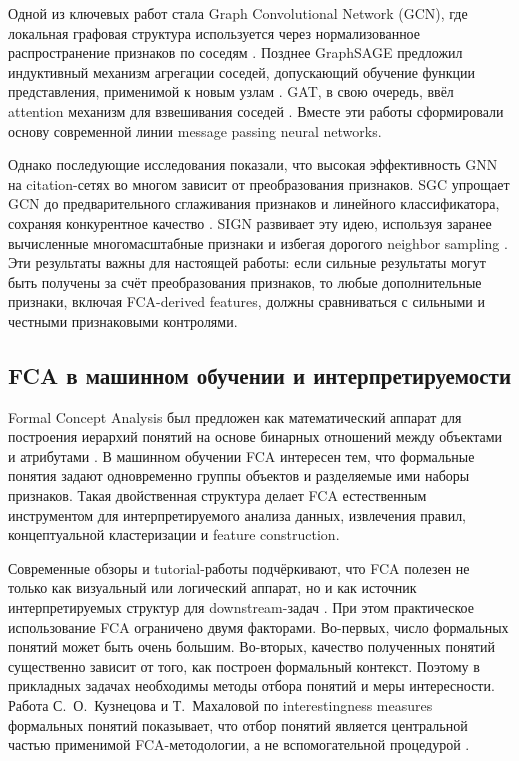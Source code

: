 \documentclass[14pt,a4paper]{extarticle}
\begin{document}
Одной из ключевых работ стала Graph Convolutional Network (GCN), где локальная
графовая структура используется через нормализованное распространение признаков
по соседям \cite{kipf2017gcn}. Позднее GraphSAGE предложил индуктивный механизм
агрегации соседей, допускающий обучение функции представления, применимой к
новым узлам \cite{hamilton2017graphsage}. GAT, в свою очередь, ввёл attention
механизм для взвешивания соседей \cite{velickovic2018gat}. Вместе эти работы
сформировали основу современной линии message passing neural networks.

Однако последующие исследования показали, что высокая эффективность GNN на
citation-сетях во многом зависит от преобразования признаков. SGC упрощает GCN
до предварительного сглаживания признаков и линейного классификатора, сохраняя
конкурентное качество \cite{wu2019sgc}. SIGN развивает эту идею, используя
заранее вычисленные многомасштабные признаки и избегая дорогого neighbor
sampling \cite{frasca2020sign}. Эти результаты важны для настоящей работы:
если сильные результаты могут быть получены за счёт преобразования признаков,
то любые дополнительные признаки, включая FCA-derived features, должны
сравниваться с сильными и честными признаковыми контролями.

\subsection{FCA в машинном обучении и интерпретируемости}

Formal Concept Analysis был предложен как математический аппарат для построения
иерархий понятий на основе бинарных отношений между объектами и атрибутами
\cite{wille1982restructuring,ganter1999formal}. В машинном обучении FCA
интересен тем, что формальные понятия задают одновременно группы объектов и
разделяемые ими наборы признаков. Такая двойственная структура делает FCA
естественным инструментом для интерпретируемого анализа данных, извлечения
правил, концептуальной кластеризации и feature construction.

Современные обзоры и tutorial-работы подчёркивают, что FCA полезен не только
как визуальный или логический аппарат, но и как источник интерпретируемых
структур для downstream-задач \cite{ignatov2017fca_tutorial,kwuida2021conceptml}.
При этом практическое использование FCA ограничено двумя факторами. Во-первых,
число формальных понятий может быть очень большим. Во-вторых, качество
полученных понятий существенно зависит от того, как построен формальный контекст.
Поэтому в прикладных задачах необходимы методы отбора понятий и меры
интересности. Работа С.~О.~Кузнецова и Т.~Махаловой по interestingness measures
формальных понятий показывает, что отбор понятий является центральной частью
применимой FCA-методологии, а не вспомогательной процедурой
\cite{kuznetsov2018interestingness}.
\end{document}
